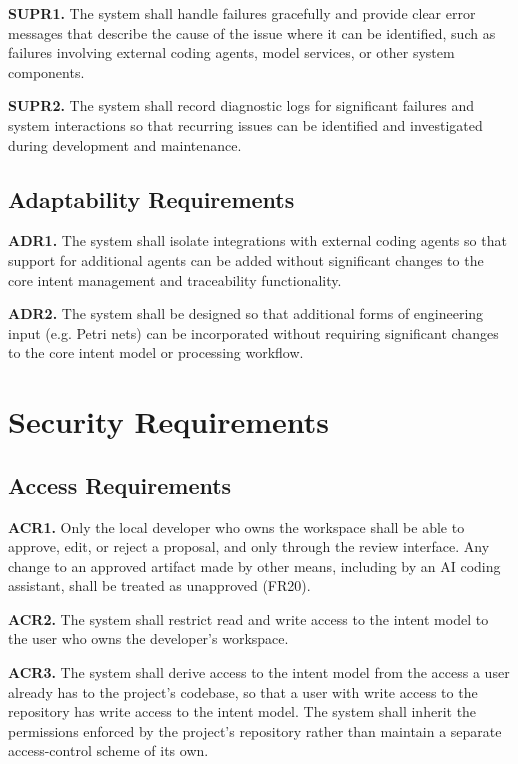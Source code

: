 \documentclass[12pt]{article}
\begin{document}
\noindent\textbf{SUPR1.} The system shall handle failures gracefully and provide clear error messages that describe the cause of the issue where it can be identified, such as failures involving external coding agents, model services, or other system components.

\noindent\textbf{SUPR2.} The system shall record diagnostic logs for significant failures and system interactions so that recurring issues can be identified and investigated during development and maintenance.

\subsection{Adaptability Requirements}

\noindent\textbf{ADR1.} The system shall isolate integrations with external coding agents so that support for additional agents can be added without significant changes to the core intent management and traceability functionality.

\noindent\textbf{ADR2.} The system shall be designed so that additional forms of engineering input (e.g. Petri nets) can be incorporated without requiring significant changes to the core intent model or processing workflow.

\section{Security Requirements}

\subsection{Access Requirements}

\medskip
\noindent\textbf{ACR1.} Only the local developer who owns the workspace shall be
able to approve, edit, or reject a proposal, and only through the \progname{}
review interface. Any change to an approved artifact made by other means,
including by an AI coding assistant, shall be treated as unapproved (FR20). 

\medskip
\noindent\textbf{ACR2.} The system shall restrict read and write access to the
intent model to the user who owns the developer's workspace. 

\medskip
\noindent\textbf{ACR3.} The system shall derive access to the intent model from
the access a user already has to the project's codebase, so that a user with
write access to the repository has write access to the intent model. The
system shall inherit the permissions enforced by the project's repository rather
than maintain a separate access-control scheme of its own.
\end{document}
